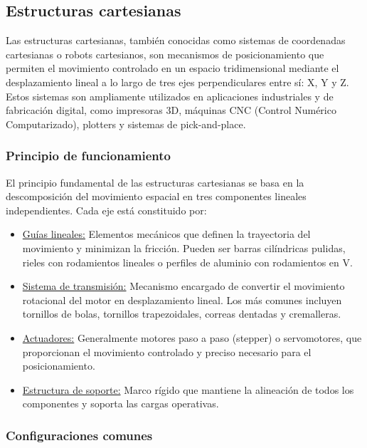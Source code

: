 \subsection{Estructuras cartesianas}

Las estructuras cartesianas, también conocidas como sistemas de coordenadas cartesianas o robots cartesianos, son mecanismos de posicionamiento que permiten el movimiento controlado en un espacio tridimensional mediante el desplazamiento lineal a lo largo de tres ejes perpendiculares entre sí: X, Y y Z. Estos sistemas son ampliamente utilizados en aplicaciones industriales y de fabricación digital, como impresoras 3D, máquinas CNC (Control Numérico Computarizado), plotters y sistemas de pick-and-place.

\subsubsection{Principio de funcionamiento}

El principio fundamental de las estructuras cartesianas se basa en la descomposición del movimiento espacial en tres componentes lineales independientes. Cada eje está constituido por:

\begin{itemize}[label=$\bullet$]
    \item \underline{Guías lineales:} Elementos mecánicos que definen la trayectoria del movimiento y minimizan la fricción. Pueden ser barras cilíndricas pulidas, rieles con rodamientos lineales o perfiles de aluminio con rodamientos en V.

    \item \underline{Sistema de transmisión:} Mecanismo encargado de convertir el movimiento rotacional del motor en desplazamiento lineal. Los más comunes incluyen tornillos de bolas, tornillos trapezoidales, correas dentadas y cremalleras.

    \item \underline{Actuadores:} Generalmente motores paso a paso (stepper) o servomotores, que proporcionan el movimiento controlado y preciso necesario para el posicionamiento.

    \item \underline{Estructura de soporte:} Marco rígido que mantiene la alineación de todos los componentes y soporta las cargas operativas.
\end{itemize}

\subsubsection{Configuraciones comunes}

